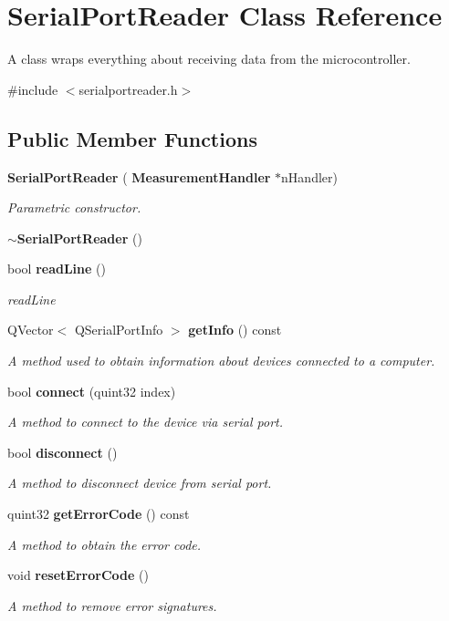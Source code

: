 \section{Serial\+Port\+Reader Class Reference}
\label{class_serial_port_reader}


A class wraps everything about receiving data from the microcontroller.  




{\ttfamily \#include $<$serialportreader.\+h$>$}

\subsection*{Public Member Functions}
\begin{DoxyCompactItemize}
\item 
\textbf{ Serial\+Port\+Reader} (\textbf{ Measurement\+Handler} $\ast$n\+Handler)
\begin{DoxyCompactList}\small\item\em Parametric constructor. \end{DoxyCompactList}\item 
\textbf{ $\sim$\+Serial\+Port\+Reader} ()
\item 
bool \textbf{ read\+Line} ()
\begin{DoxyCompactList}\small\item\em read\+Line \end{DoxyCompactList}\item 
Q\+Vector$<$ Q\+Serial\+Port\+Info $>$ \textbf{ get\+Info} () const
\begin{DoxyCompactList}\small\item\em A method used to obtain information about devices connected to a computer. \end{DoxyCompactList}\item 
bool \textbf{ connect} (quint32 index)
\begin{DoxyCompactList}\small\item\em A method to connect to the device via serial port. \end{DoxyCompactList}\item 
bool \textbf{ disconnect} ()
\begin{DoxyCompactList}\small\item\em A method to disconnect device from serial port. \end{DoxyCompactList}\item 
quint32 \textbf{ get\+Error\+Code} () const
\begin{DoxyCompactList}\small\item\em A method to obtain the error code. \end{DoxyCompactList}\item 
void \textbf{ reset\+Error\+Code} ()
\begin{DoxyCompactList}\small\item\em A method to remove error signatures. \end{DoxyCompactList}\end{DoxyCompactItemize}
